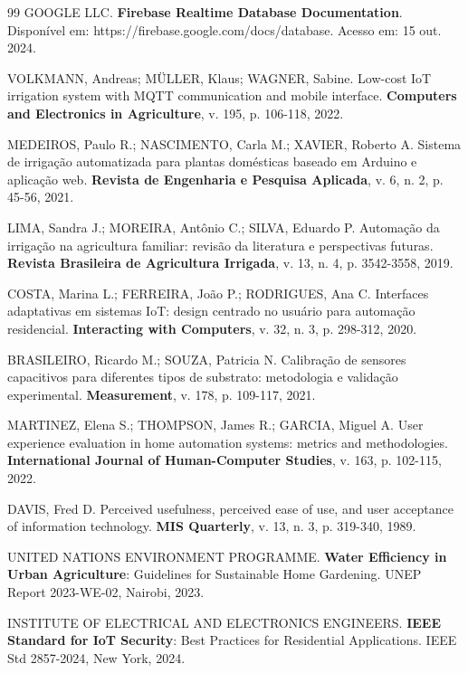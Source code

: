 \begin{thebibliography}{99}
GOOGLE LLC. \textbf{Firebase Realtime Database Documentation}. Disponível em: https://firebase.google.com/docs/database. Acesso em: 15 out. 2024.

VOLKMANN, Andreas; MÜLLER, Klaus; WAGNER, Sabine. Low-cost IoT irrigation system with MQTT communication and mobile interface. \textbf{Computers and Electronics in Agriculture}, v. 195, p. 106-118, 2022.

MEDEIROS, Paulo R.; NASCIMENTO, Carla M.; XAVIER, Roberto A. Sistema de irrigação automatizada para plantas domésticas baseado em Arduino e aplicação web. \textbf{Revista de Engenharia e Pesquisa Aplicada}, v. 6, n. 2, p. 45-56, 2021.

LIMA, Sandra J.; MOREIRA, Antônio C.; SILVA, Eduardo P. Automação da irrigação na agricultura familiar: revisão da literatura e perspectivas futuras. \textbf{Revista Brasileira de Agricultura Irrigada}, v. 13, n. 4, p. 3542-3558, 2019.

COSTA, Marina L.; FERREIRA, João P.; RODRIGUES, Ana C. Interfaces adaptativas em sistemas IoT: design centrado no usuário para automação residencial. \textbf{Interacting with Computers}, v. 32, n. 3, p. 298-312, 2020.

BRASILEIRO, Ricardo M.; SOUZA, Patricia N. Calibração de sensores capacitivos para diferentes tipos de substrato: metodologia e validação experimental. \textbf{Measurement}, v. 178, p. 109-117, 2021.

MARTINEZ, Elena S.; THOMPSON, James R.; GARCIA, Miguel A. User experience evaluation in home automation systems: metrics and methodologies. \textbf{International Journal of Human-Computer Studies}, v. 163, p. 102-115, 2022.

DAVIS, Fred D. Perceived usefulness, perceived ease of use, and user acceptance of information technology. \textbf{MIS Quarterly}, v. 13, n. 3, p. 319-340, 1989.

UNITED NATIONS ENVIRONMENT PROGRAMME. \textbf{Water Efficiency in Urban Agriculture}: Guidelines for Sustainable Home Gardening. UNEP Report 2023-WE-02, Nairobi, 2023.

INSTITUTE OF ELECTRICAL AND ELECTRONICS ENGINEERS. \textbf{IEEE Standard for IoT Security}: Best Practices for Residential Applications. IEEE Std 2857-2024, New York, 2024.

\end{thebibliography}


